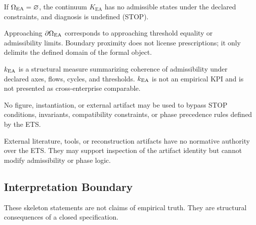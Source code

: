 \begin{theorem}
If $\Omega_{\mathrm{EA}}=\varnothing$, the continuum $K_{\mathrm{EA}}$ has no
admissible states under the declared constraints, and diagnosis is
undefined (STOP).
\end{theorem}

\begin{theorem}
Approaching $\partial\Omega_{\mathrm{EA}}$ corresponds to approaching threshold equality or
admissibility limits. Boundary proximity does not license prescriptions;
it only delimits the defined domain of the formal object.
\end{theorem}

\begin{theorem}
$k_{\mathrm{EA}}$ is a structural measure summarizing coherence of admissibility
under declared axes, flows, cycles, and thresholds. $k_{\mathrm{EA}}$ is not an
empirical KPI and is not presented as cross-enterprise comparable.
\end{theorem}

\begin{theorem}
No figure, instantiation, or external artifact may be used to bypass
STOP conditions, invariants, compatibility constraints, or phase
precedence rules defined by the ETS.
\end{theorem}

\begin{theorem}
External literature, tools, or reconstruction artifacts have no
normative authority over the ETS. They may support inspection of the
artifact identity but cannot modify admissibility or phase logic.
\end{theorem}

\subsection*{Interpretation Boundary}

These skeleton statements are not claims of empirical truth.
They are structural consequences of a closed specification.

